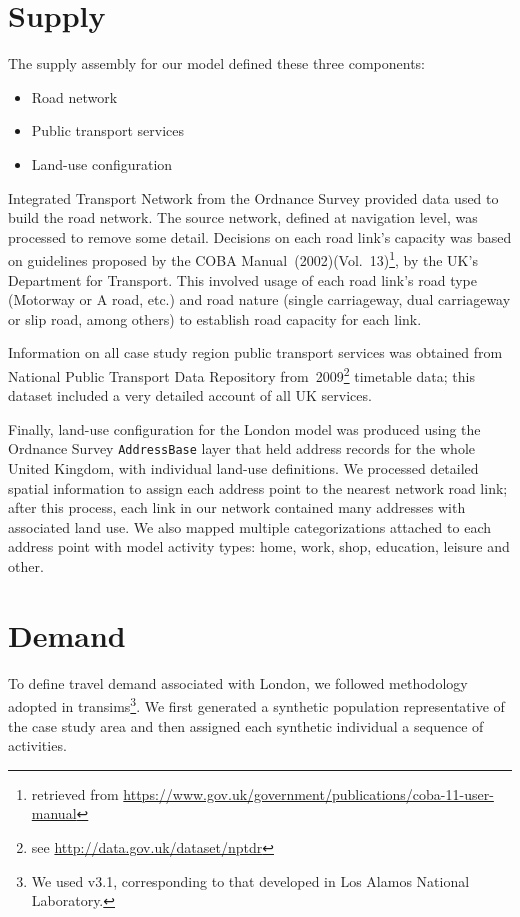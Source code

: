 \section{Supply}
The supply assembly for our model defined these three components:
%
\begin{itemize}\styleItemize
\item	Road network
\item	Public transport services
\item	Land-use configuration
\end{itemize}
%
Integrated Transport Network from the Ordnance Survey provided data used to build the road network. 
The source network, defined at navigation level, was processed to remove some detail. 
Decisions on each road link's capacity was based on guidelines proposed by the COBA Manual~(2002)(Vol.~13)\footnote{retrieved from \url{https://www.gov.uk/government/publications/coba-11-user-manual}}, by the UK’s Department for Transport. 
This involved usage of each road link’s road type (Motorway or A road, etc.) and road nature (single carriageway, dual carriageway or slip road, among others) to establish road capacity for each link.

Information on all case study region public transport services was obtained from National Public Transport Data Repository from~2009\footnote{see \url{http://data.gov.uk/dataset/nptdr}} timetable data; this dataset included a very detailed account of all UK services.

Finally, land-use configuration for the London model was produced using the Ordnance Survey \lstinline|AddressBase| layer that held address records for the whole United Kingdom, with individual land-use definitions. 
We processed detailed spatial information to assign each address point to the nearest network road link; after this process, each link in our network contained many addresses with associated land use. 
We also mapped multiple categorizations attached to each address point with model activity types: home, work, shop, education, leisure and other.

\section{Demand}
To define travel demand associated with London, we followed methodology adopted in \gls{transims}\footnote {We used v3.1, corresponding to that developed in Los Alamos National Laboratory.}. We first generated a synthetic population representative of the case study area and then assigned each synthetic individual a sequence of activities.

